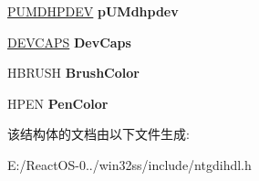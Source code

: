 \begin{DoxyCompactItemize}
\hyperlink{interfacevoid}{P\+U\+M\+D\+H\+P\+D\+EV} {\bfseries p\+U\+Mdhpdev}
\item 
\mbox{\label{struct___l_d_c_a70755f1b9a4612f781c93f165735f1bb}} 
\hyperlink{struct___d_e_v_c_a_p_s}{D\+E\+V\+C\+A\+PS} {\bfseries Dev\+Caps}
\item 
\mbox{\label{struct___l_d_c_a84108a5631c9835006e8a668196d26a0}} 
H\+B\+R\+U\+SH {\bfseries Brush\+Color}
\item 
\mbox{\label{struct___l_d_c_a3eb06d13be5362114fbe643cf56c419a}} 
H\+P\+EN {\bfseries Pen\+Color}
\end{DoxyCompactItemize}


该结构体的文档由以下文件生成\+:\begin{DoxyCompactItemize}
\item 
E\+:/\+React\+O\+S-\/0../win32ss/include/ntgdihdl.\+h\end{DoxyCompactItemize}
